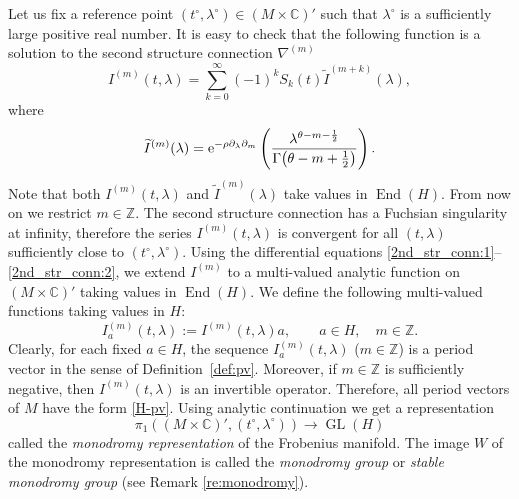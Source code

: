 \documentclass[pdftex]{sigma}
\numberwithin{equation}{section}
\newcommand{\CC}{\mathbb{C}}
\newcommand{\ZZ}{\mathbb{Z}}
\newcommand{\op}{\operatorname}
\begin{document}
Let us fix a reference point $(t^\circ,\lambda^\circ)\in (M\times
\CC)'$ such that $\lambda^\circ$ is a sufficiently
large positive real number. It is
easy to check that the following function is a solution to the second
structure connection $\nabla^{(m)}$
\begin{equation}\label{fundamental_period}
I^{(m)}(t,\lambda) = \sum_{k=0}^\infty (-1)^k S_k(t) \widetilde{I}^{(m+k)}(\lambda),
\end{equation}
where
\[%
\widetilde{I}^{(m)}(\lambda) = {\rm e}^{-\rho \partial_\lambda \partial_m}
\left(
\frac{\lambda^{\theta-m-\frac{1}{2}} }{ \Gamma\big(\theta-m+\frac{1}{2}\big) }
\right).
\]
Note that both $I^{(m)}(t,\lambda)$ and $\widetilde{I}^{(m)}(\lambda)$
take values in $\op{End}(H)$. From now on we restrict ${m\in \ZZ}$.
The second structure connection has a
Fuchsian singularity at infinity, therefore the series ${I^{(m)}(t,\lambda)}$ is
convergent for all $(t,\lambda)$ sufficiently close to
$(t^\circ,\lambda^\circ)$. Using the differential equations
\eqref{2nd_str_conn:1}--\eqref{2nd_str_conn:2}, we extend
$I^{(m)}$ to a multi-valued analytic function on $(M\times \CC)'$
taking values in $\op{End}(H)$. We define the following multi-valued
functions taking values in $H$:
\begin{equation}\label{H-pv}
I^{(m)}_a(t,\lambda):=I^{(m)}(t,\lambda) a,
\qquad a\in H,\quad m\in \ZZ.
\end{equation}
Clearly, for each fixed $a\in H$, the sequence $I^{(m)}_a(t,\lambda)$
($m\in \ZZ$) is a period vector in the sense of Definition~\ref{def:pv}. Moreover, if $m\in \ZZ$ is sufficiently negative, then
$I^{(m)}(t,\lambda)$ is an invertible operator. Therefore, all period
vectors of $M$ have the form \eqref{H-pv}. Using analytic
continuation we get a representation
\[%
\pi_1((M\times\CC)',(t^\circ,\lambda^\circ) )\to \operatorname{GL}(H)
\]
called the {\em monodromy representation} of the Frobenius
manifold. The image $W$ of the monodromy representation is called the
{\em monodromy group} or {\em stable monodromy group} (see Remark
\ref{re:monodromy}).
\end{document}
